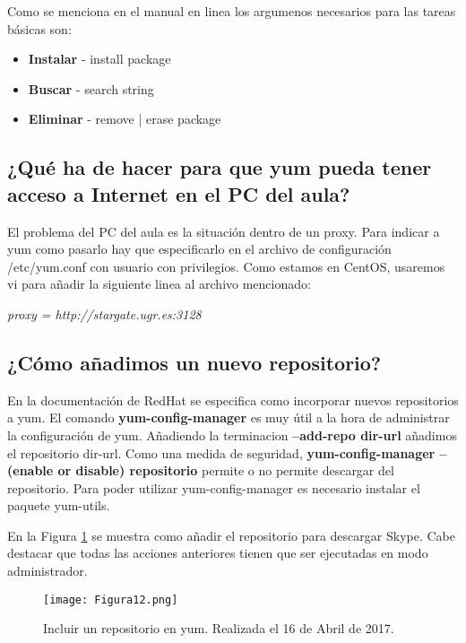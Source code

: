 Como se menciona en el manual en linea\cite{manyum} los argumenos necesarios para las tareas básicas son:
\begin{itemize}
	\item \textbf{Instalar} - install package
	\item \textbf{Buscar} - search string
	\item \textbf{Eliminar} - remove | erase package
\end{itemize} 

\vspace{6mm}

\subsection{¿Qué ha de hacer para que yum pueda tener acceso a Internet en el PC del aula?}

El problema del PC del aula es la situación dentro de un proxy. Para indicar a yum como pasarlo\cite{proxyyum} hay que especificarlo en el
archivo de configuración /etc/yum.conf con usuario con privilegios. Como estamos en CentOS, usaremos vi para añadir la siguiente
linea al archivo mencionado:

\textit{proxy = http://stargate.ugr.es:3128}

\vspace{6mm}

\subsection{¿Cómo añadimos un nuevo repositorio?}

En la documentación de RedHat\cite{redyum} se especifica como incorporar nuevos repositorios a yum. El comando \textbf{yum-config-manager} es muy
útil a la hora de administrar la configuración de yum. Añadiendo la terminacion \textbf{--add-repo dir-url} añadimos el repositorio dir-url.
Como una medida de seguridad, \textbf{yum-config-manager --(enable or disable) repositorio} permite o no permite descargar del repositorio. Para poder utilizar yum-config-manager es necesario instalar el paquete yum-utils.

En la Figura \ref{fig:figura12} se muestra como añadir el repositorio para descargar Skype. Cabe destacar que todas las acciones anteriores tienen que ser ejecutadas
en modo administrador.

\begin{figure}[H] 
\centering
\texttt{[image: Figura12.png]}  
\caption{Incluir un repositorio en yum. Realizada el 16 de Abril de 2017.} \label{fig:figura12}
\end{figure}





